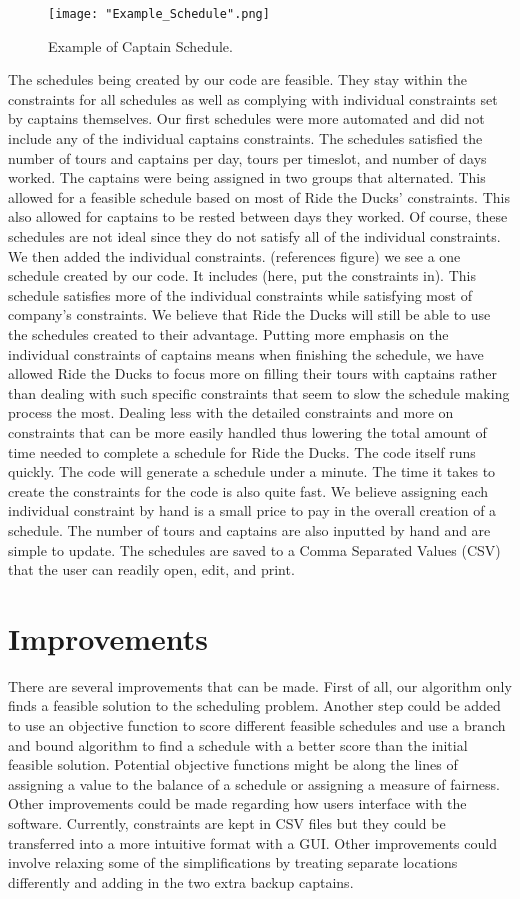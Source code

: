 \documentclass[12pt]{article}
\begin{document}
\begin{figure}[h!]
\centering
\texttt{[image: "Example\_Schedule".png]}
\caption{Example of Captain Schedule.}
\end{figure}
The schedules being created by our code are feasible. They stay within the constraints for all schedules as well as complying with individual constraints set by captains themselves. Our first schedules were more automated and did not include any of the individual captains constraints. The schedules satisfied the number of tours and captains per day, tours per timeslot, and number of days worked. The captains were being assigned in two groups that alternated. This allowed for a feasible schedule based on most of Ride the Ducks’ constraints. This also allowed for captains to be rested between days they worked. Of course, these schedules are not ideal since they do not satisfy all of the individual constraints. We then added the individual constraints. (references figure) we see a one schedule created by our code. It includes (here, put the constraints in). This schedule satisfies more of the individual constraints while satisfying most of company’s constraints. We believe that Ride the Ducks will still be able to use the schedules created to their advantage. Putting more emphasis on the individual constraints of captains means when finishing the schedule, we have allowed Ride the Ducks to focus more on filling their tours with captains rather than dealing with such specific constraints that seem to slow the schedule making process the most. Dealing less with the detailed constraints and more on constraints that can be more easily handled thus lowering the total amount of time needed to complete a schedule for Ride the Ducks. The code itself runs quickly. The code will generate a schedule under a minute. The time it takes to create the constraints for the code is also quite fast. We believe assigning each individual constraint by hand is a small price to pay in the overall creation of a schedule. The number of tours and captains are also inputted by hand and are simple to update. The schedules are saved to a Comma Separated Values (CSV) that the user can readily open, edit, and print. 


\section*{Improvements}
There are several improvements that can be made. First of all, our algorithm only finds a feasible solution to the scheduling problem. Another step could be added to use an objective function to score different feasible schedules and use a branch and bound algorithm to find a schedule with a better score than the initial feasible solution. Potential objective functions might be along the lines of assigning a value to the balance of a schedule or assigning a measure of fairness. Other improvements could be made regarding how users interface with the software. Currently, constraints are kept in CSV files but they could be transferred into a more intuitive format with a GUI. Other improvements could involve relaxing some of the simplifications by treating separate locations differently and adding in the two extra backup captains. 
\end{document}
